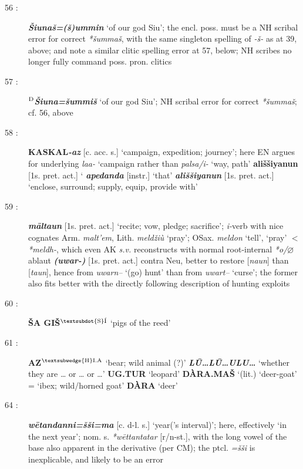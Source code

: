 \documentclass[10pt]{article}
\newcommand{\supersc}[1]{$^{\textrm{\scriptsize{#1}}}$}  	%
\newcommand{\bit}[1]{\textbf{\textit{#1}}}				%
\newcommand{\p}[1]{{\tiny[{#1}]}}					%
\newcommand{\zero}{{\footnotesize $\varnothing$}}				%
\newcommand{\hith}{\textsubwedge{h}}
\newcommand{\Hith}{\textsubwedge{H}}
\newcommand{\hpl}{\supersc{{\Hith}I.A}}
\renewcommand{\.}[1]{\textsubdot{#1}}
\begin{document}
\begin{description}
\item[56 :] \bit{\v{S}iuna\v{s}=(\v{s})ummin} `of our god Siu'; the encl. poss. must be a NH scribal error for correct \textit{*\v{s}umma\v{s}}, with the same singleton spelling of \textit{-\v{s}-} as at 39, above; and note a similar clitic spelling error at 57, below; NH scribes no longer fully command poss. pron. clitics

\item[57 :] \textbf{\supersc{D}}\bit{\v{S}iuna=\v{s}ummi\v{s}} `of our god Siu'; NH scribal error for correct \textit{*\v{s}umma\v{s}}; cf. 56, above

\item[58 :] \textbf{KASKAL}\bit{-az} \p{c. acc. s.} `campaign, expedition; journey'; here EN argues for underlying \textit{la{\hith\hith}a-} `campaign rather than \textit{palsa/i-} `way, path' \textbf{{\hith}ali\v{s}\v{s}iyanun} \p{1s. pret. act.} ` \textbf{\textit{apedanda}} \p{instr.} `that' \bit{{\hith}ali\v{s}\v{s}iyanun} \p{1s. pret. act.} `enclose, surround; supply, equip, provide with' 

\item[59 :] \bit{m\=alta{\hith}un} \p{1s. pret. act.} `recite; vow, pledge; sacrifice'; \textit{{\hith}i-}verb with nice cognates Arm. \textit{malt'em}, Lith. \textit{meld\v{z}i\`u}  `pray'; OSax. \textit{meldon} `tell', `pray' $<$ \textit{*meldh-}, which even AK \textit{s.v.} reconstructs with normal root-internal \textit{*o/{\zero}} ablaut \bit{({\hith}uwar-)} \p{1s. pret. act.} contra Neu, better to restore [\textit{na{\hith}{\hith}un}] than [\textit{ta{\hith}{\hith}un}], hence from \textit{{\hith}uwarn--} `(go) hunt' than from \textit{{\hith}uwart--} `curse'; the former also fits better with the directly following description of hunting exploits

\item[60 :] \textbf{\v{S}A{\Hith} GI\v{S}\textit{\supersc{\textsubdot{S}\'I}}} `pigs of the reed'

\item[61 :] \textbf{AZ{\hpl}} `bear; wild animal (?)' \textbf{\textit{L\=U{\ldots}L\=U{\ldots}ULU{\ldots}}} `whether they are {\ldots} or {\ldots} or {\ldots}' \textbf{UG.TUR} `leopard' \textbf{D\`ARA.MA\v{S}} `(lit.) `deer-goat' = `ibex; wild/horned goat' \textbf{D\`ARA} `deer'

\item[64 :] \bit{w\=etandanni=\v{s}\v{s}i=ma} \p{c. d-l. s.} `year('s interval)'; here, effectively `in the next year'; nom. s. \textit{*w\=ettantatar} \p{r/n-st.}, with the long vowel of the base also apparent in the derivative (per CM); the ptcl. \textit{=\v{s}\v{s}i} is inexplicable, and likely to be an error


\end{description}
\end{document}
